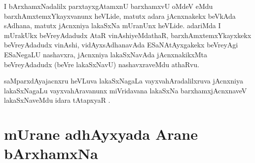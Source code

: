 
\begin{artha}
I bArxhamxNadalilx parxtayxgAtamxnU barxhamxvU oMdeV eMdu barxhAmxtemxYkayxvanunx heVLide, matutx adara jAcnxnakekx beVkAda sAdhana, matutx jAcnxniya lakaSxNa mUranUnx heVLide. adariMda I mUrakUkx beVreyAdadudx AtaR vinAshiyeMdathaR, barxhAmxtemxYkayxkekx beVreyAdadudx vinAshi, vidAyxsAdhanavAda ESaNAtAyxgakekx beVreyAgi ESaNegaLU nashavxra, jAcnxniya lakaSxNavAda jAcnxnakikxMta beVreyAdadudx (beVre lakaSxNavU) nashavxraveMdu athaRvu.
\end{artha}

\begin{artha}
saMparxdAyajacnxru heVLuva lakaSxNagaLa vayxvahAradalilxruva jAcnxniya lakaSxNagaLu vayxvahAravanunx miVridavana lakaSxNa barxhamxjAcnxnaveV lakaSxNaveMdu idara tAtapxyaR .
\end{artha}



\section*{mUrane adhAyxyada Arane bArxhamxNa}


